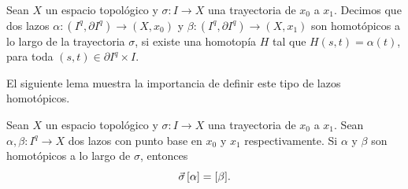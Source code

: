 \begin{definicion}
    Sean $X$ un espacio topológico y $\sigma:I\to X$ una trayectoria de $x_0$ a $x_1$. Decimos que dos lazos $\alpha:(I^q,\partial I^q)\to (X,x_0)$ y $\beta:(I^q,\partial I^q)\to (X,x_1)$ son homotópicos a lo largo de la trayectoria $\sigma$, si existe una homotopía $H$ tal que $H(s,t)=\alpha(t)$, para toda $(s,t)\in\partial I^q\times I$.  
\end{definicion}

El siguiente lema muestra la importancia de definir este tipo de lazos homotópicos.
\begin{lema}
\label{lema:sigma alpha cong beta}
    Sean $X$ un espacio topológico y $\sigma:I\to X$ una trayectoria de $x_0$ a $x_1$. Sean $\alpha,\beta:I^q\to X$ dos lazos con punto base en $x_0$ y $x_1$ respectivamente. Si $\alpha$ y $\beta$ son homotópicos a lo largo de $\sigma$, entonces
    \[
        \vec{\sigma}\hspace{0.5mm}[\alpha]=[\beta].
    \]
\end{lema}
